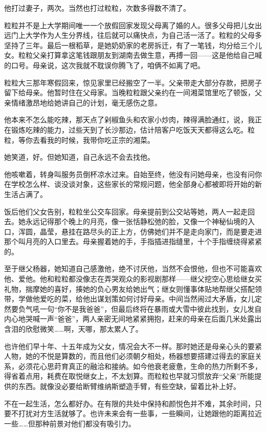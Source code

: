 \documentclass[lang=cn,newtx,12pt,scheme=chinese]{elegantbook}
\begin{document}
他打过妻子，两次。当然也打过粒粒，次数多得数不清了。

粒粒并不是上大学期间唯一一个放假回家发现父母离了婚的人。很多父母把儿女出远门上大学作为人生分界线，往后就可以痛快点，为自己活一活了。粒粒的父母多坚持了三年。最后一根稻草，是她奶奶家的老房拆迁，有了一笔钱，均分给三个儿女。粒粒父亲打算拿这笔钱跟朋友到湖南去做生意，再搏一回——这是他给自己喊的口号。母亲说，这次我就不耽误你腾飞了，咱俩不如离了吧。

粒粒大三那年寒假回来，惊见家里已经搬空了一半。父亲带走大部分存款，把房子留下给母亲。他暂时住在父母家。当晚粒粒跟父亲约在一间湘菜馆里吃了顿饭，父亲情绪激昂地给她讲自己的计划，毫无感伤之意。

他本来不怎么能吃辣，那天点了剁椒鱼头和农家小炒肉，辣得满脸通红，说，我正在锻炼吃辣的能力，过些天到了长沙那边，估计陪客户吃饭天天都得这么吃。粒粒，等你去看我的时候，我带你吃正宗的湘菜。

她笑道，好。但她知道，自己永远不会去找他。

他咳嗽着，转身叫服务员倒杯凉水过来。自始至终，他没有问她母亲，也没有问你在学校怎么样、谈没谈对象，这些家长的常规问题，他全部身心都被即将开始的新生活占满了。

饭后他们父女告别，粒粒坐公交车回家。母亲提前到公交站等她，两人一起走回去。她永远记得那个晚上的月亮，像一张恬静松弛的脸，又像一个神秘仙境的入口，浑圆，晶莹，悬挂在路尽头的正上方，仿佛她们并不是走向家门，而是要走进那个叫月亮的入口里去。母亲握着她的手，手指插进指缝里，十个手指缠绕得紧紧的。

至于继父杨器，她知道自己感激他，绝不讨厌他，当然不会恨他，但也不可能喜欢他、爱他。他和粒粒都没像志在弄哭观众的影视剧那样——继父挖空心思给继女买礼物，揣摩她的喜好，揍她的负心男友给她出气；继女则懂事体贴地帮继父搭配领带，学做他爱吃的菜，给他出谋划策如何讨好母亲。中间当然闹过大矛盾，女儿定然要负气吼一句“你不是我爸爸”，但最后终将在暴雨或大雪中彼此找到，女儿发自内心地哭喊一声“爸爸”，两人亲密无间地紧紧拥抱，赶来的母亲在后面几米处露出含泪的欣慰微笑……啊，天哪，那太累人了。

也许他们早十年、十五年成为父女，情况会大不一样。那时她还是母亲心头的要紧人物，她的不悦是算数的，而且他们必须朝夕相处，杨器想要搭建过得去的家庭关系，必须花心思莳育真正的融洽和接纳。如今他衰老疲惫，生命的热力所剩不多，得省着点用，耗费在取悦继女上，不太划算。而粒粒也早就习惯放弃“父亲”所能提供的东西。就像没必要给断臂维纳斯塑造手臂，有些空缺，留着比补上好。

不在一起生活，怎么都好办。在有限的共处中保持和颜悦色并不难，其余时间，只要不打扰对方生活就够了。也许未来会有一些事，一些瞬间，让她跟他的距离拉近一些……但那种前景对他们都没有吸引力。
\end{document}
